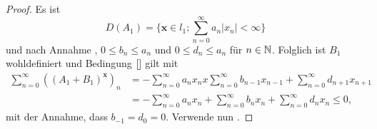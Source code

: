 \begin{proof}
Es ist
\begin{equation}
D(A_1)=\bigg\{\textbf{x}\in l_1;\sum_{n=0}^\infty a_n|x_n|< \infty\bigg\}
\end{equation}
und nach Annahme \Cref{}, $0\leq b_n\leq a_n$ und $0\leq d_n\leq a_n$ für $n\in\mathbb{N}$. Folglich ist $B_1$ wohldefiniert und Bedingung $\Cref{}$ gilt mit 
\begin{align}
\sum_{n=0}^\infty ((A_1+B_1)^\textbf{x})_n
&= -\sum_{n=0}^\infty a_n x_n x\sum_{n=0}^\infty b_{n-1}x_{n-1}+\sum_{n=0}^\infty d_{n+1}x_{n+1}\\
&=-\sum_{n=0}^\infty a_n x_n + \sum_{n=0}^\infty b_n x_n+\sum_{n=0}^\infty d_n x_n\leq 0,
\end{align}
mit der Annahme, dass $b_{-1}=d_0=0$. Verwende nun \Cref{}.
\end{proof}



